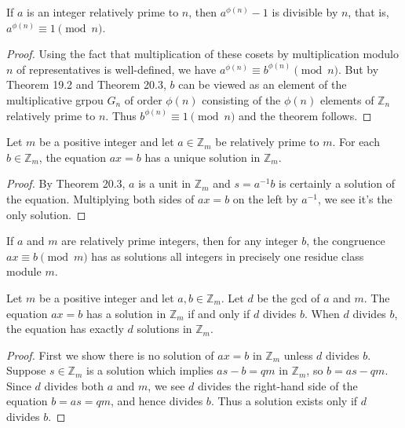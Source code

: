 \documentclass[a4paper,8pt]{article}
\begin{document}
\begin{outline}
    If \(a\) is an integer relatively prime to \(n\), then \(a^{\phi(n)} - 1\) is divisible by \(n\),
    that is, \(a^{\phi(n)} \equiv 1 \pmod{n}\).

    \begin{proof}
      Using the fact that multiplication of these cosets by multiplication modulo \(n\) of representatives is well-defined,
      we have \(a^{\phi(n)} \equiv b^{\phi(n)} \pmod{n}\). But by Theorem 19.2 and Theorem 20.3, \(b\) can be viewed as an
      element of the multiplicative grpou \(G_n\) of order \(\phi(n)\) consisting of the \(\phi(n)\) elements of
      \(\mathbb{Z}_n\) relatively prime to \(n\). Thus \(b^{\phi(n)} \equiv 1 \pmod{n}\) and the theorem follows.
    \end{proof}

    Let \(m\) be a positive integer and let \(a \in \mathbb{Z}_m\) be relatively prime to \(m\).
    For each \(b \in \mathbb{Z}_m\), the equation \(ax = b\) has a unique solution in \(\mathbb{Z}_m\).

    \begin{proof}
      By Theorem 20.3, \(a\) is a unit in \(\mathbb{Z}_m\) and \(s = a^{-1}b\) is certainly a solution of the equation.
      Multiplying both sides of \(ax = b\) on the left by \(a^{-1}\), we see it's the only solution.
    \end{proof}

    If \(a\) and \(m\) are relatively prime integers, then for any integer \(b\), the congruence
    \(ax \equiv b \pmod{m}\) has as solutions all integers in precisely one residue class module \(m\).

    Let \(m\) be a positive integer and let \(a, b \in \mathbb{Z}_m\). Let \(d\) be the gcd of
    \(a\) and \(m\). The equation \(ax = b\) has a solution in \(\mathbb{Z}_m\) if and only if \(d\)
    divides \(b\). When \(d\) divides \(b\), the equation has exactly \(d\) solutions in \(\mathbb{Z}_m\).

    \begin{proof}
      First we show there is no solution of \(ax = b\) in \(\mathbb{Z}_m\) unless \(d\) divides \(b\). Suppose
      \(s \in \mathbb{Z}_m\) is a solution which implies \(as - b = qm\) in \(\mathbb{Z}_m\), so \(b = as - qm\).
      Since \(d\) divides both \(a\) and \(m\), we see \(d\) divides the right-hand side of the equation
      \(b = as = qm\), and hence divides \(b\). Thus a solution exists only if \(d\) divides \(b\).


\end{proof}
\end{outline}
\end{document}
